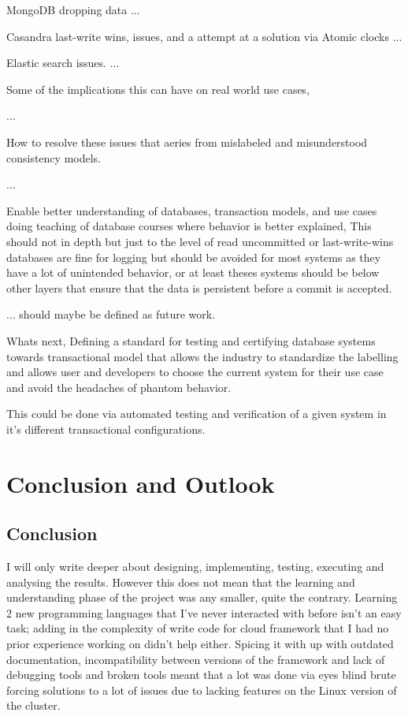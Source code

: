 \documentclass[a4paper,10pt,titlepage]{report}
\begin{document}
    MongoDB dropping data
    ...

    Casandra last-write wins, issues, and a attempt at a solution via Atomic clocks
    ...

    Elastic search issues.
    ...

    Some of the implications this can have on real world use cases,

    ...

    How to resolve these issues that aeries from mislabeled and misunderstood consistency models.

    ...

    Enable better understanding of databases, transaction models, and use cases doing teaching of database courses where behavior is better explained, This should not in depth but just to the level of read uncommitted or last-write-wins databases are fine for logging but should be avoided for most systems as they have a lot of unintended behavior, or at least theses systems should be below other layers that ensure that the data is persistent before a commit is accepted.

    ... should maybe be defined as future work.

    Whats next, Defining a standard for testing and certifying database systems towards transactional model that allows the industry to standardize the labelling and allows user and developers to choose the current system for their use case and avoid the headaches of phantom behavior.

    This could be done via automated testing and verification of a given system in it's different transactional configurations.


    \chapter{Conclusion and Outlook}
    \section*{Conclusion}
    
     I will only write deeper about designing, implementing, testing, executing and analysing the results. However this does not mean that the learning and understanding phase of the project was any smaller, quite the contrary. Learning 2 new programming languages that I've never interacted with before isn't an easy task; adding in the complexity of write code for cloud framework that I had no prior experience working on didn't help either. Spicing it with up with outdated documentation, incompatibility between versions of the framework and lack of debugging tools and broken tools meant that a lot was done via eyes blind brute forcing solutions to a lot of issues due to lacking features on the Linux version of the cluster.\\
     
\end{document}
